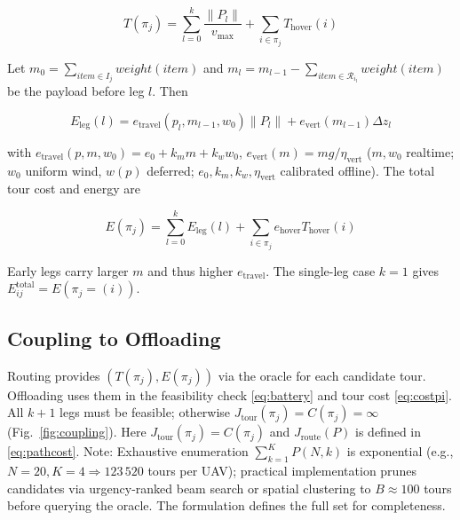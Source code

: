 \documentclass[conference]{IEEEtran}
\begin{document}
\begin{equation}
T(\pi_j)=\sum_{l=0}^{k}\frac{\|P_l\|}{v_{\max}}+\sum_{i\in\pi_j}T_{\text{hover}}(i)
\end{equation}

Let $m_0=\sum_{item\in I_j}weight(item)$ and $m_l=m_{l-1}-\sum_{item\in\mathcal{R}_{i_l}}weight(item)$ be the payload before leg $l$. Then

\begin{equation}
E_{\text{leg}}(l)=e_{\text{travel}}(p_l,m_{l-1},w_0)\|P_l\|+e_{\text{vert}}(m_{l-1})\Delta z_l
\end{equation}

with $e_{\text{travel}}(p,m,w_0)=e_0+k_m m+k_w w_0$, $e_{\text{vert}}(m)=mg/\eta_{\text{vert}}$ ($m,w_0$ realtime; $w_0$ uniform wind, $w(p)$ deferred; $e_0,k_m,k_w,\eta_{\text{vert}}$ calibrated offline). The total tour cost and energy are

\begin{equation}
E(\pi_j)=\sum_{l=0}^{k}E_{\text{leg}}(l)+\sum_{i\in\pi_j}e_{\text{hover}}T_{\text{hover}}(i)
\end{equation}

Early legs carry larger $m$ and thus higher $e_{\text{travel}}$. The single-leg case $k=1$ gives $E_{ij}^{\text{total}}=E(\pi_j=(i))$.

\subsection{Coupling to Offloading}
Routing provides $(T(\pi_j),E(\pi_j))$ via the oracle for each candidate tour. Offloading uses them in the feasibility check \eqref{eq:battery} and tour cost \eqref{eq:costpi}. All $k+1$ legs must be feasible; otherwise $J_{\text{tour}}(\pi_j)=C(\pi_j)=\infty$ (Fig.~\ref{fig:coupling}). Here $J_{\text{tour}}(\pi_j)=C(\pi_j)$ and $J_{\text{route}}(P)$ is defined in \eqref{eq:pathcost}. Note: Exhaustive enumeration $\sum_{k=1}^{K}P(N,k)$ is exponential (e.g., $N=20,K=4\Rightarrow123\,520$ tours per UAV); practical implementation prunes candidates via urgency-ranked beam search or spatial clustering to $B\approx100$ tours before querying the oracle. The formulation defines the full set for completeness.
\end{document}
